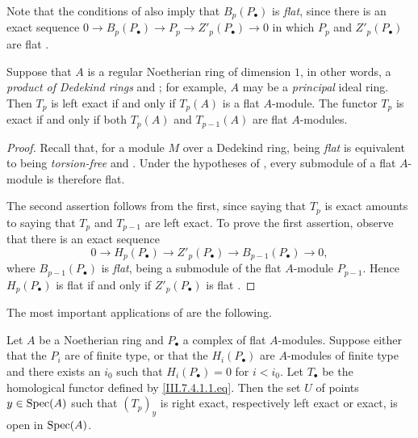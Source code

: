 Note that the conditions of  also imply that
$B_p(P_\bullet)$ is \emph{flat}, since there is an exact sequence
$0\longrightarrow B_p(P_\bullet)\longrightarrow P_p
\longrightarrow Z'_p(P_\bullet)\longrightarrow0$
in which $P_p$ and $Z'_p(P_\bullet)$ are flat
.

\begin{corollary}[7.4.3]
\label{III.7.4.3}
Suppose that $A$ is a regular Noetherian ring of dimension
$1$, in other words, a \emph{product of Dedekind rings}
 and ; for example, $A$
may be a \emph{principal} ideal ring.  Then $T_p$ is left exact if
and only if $T_p(A)$ is a flat $A$-module.  The functor $T_p$
is exact if and only if both $T_p(A)$ and $T_{p-1}(A)$ are
flat $A$-modules.
\end{corollary}

\begin{proof}
Recall that, for a module $M$ over a Dedekind ring, being \emph{flat}
is equivalent to being \emph{torsion-free}  and
.  Under the hypotheses of
, every submodule of a flat $A$-module is
therefore flat.

The second assertion follows from the first, since saying that
$T_p$ is exact amounts to saying that $T_p$ and $T_{p-1}$ are
left exact.  To prove the first assertion, observe that there
is an exact sequence
\[
  0
  \longrightarrow H_p(P_\bullet)
  \longrightarrow Z'_p(P_\bullet)
  \longrightarrow B_{p-1}(P_\bullet)
  \longrightarrow 0,
\]
where $B_{p-1}(P_\bullet)$ is \emph{flat}, being a submodule of the
flat $A$-module $P_{p-1}$.  Hence $H_p(P_\bullet)$ is flat if
and only if $Z'_p(P_\bullet)$ is flat
.
\end{proof}

The most important applications of  are the
following.

\begin{proposition}[7.4.4]
\label{III.7.4.4}
Let $A$ be a Noetherian ring and $P_\bullet$ a complex of flat
$A$-modules.  Suppose either that the $P_i$ are of finite
type, or that the $H_i(P_\bullet)$ are $A$-modules of finite
type and there exists an $i_0$ such that
$H_i(P_\bullet)=0$ for $i<i_0$.  Let $T_\bullet$ be the
homological functor defined by \eqref{III.7.4.1.1.eq}.  Then
the set $U$ of points $y\in\operatorname{Spec}(A)$ such that $(T_p)_y$
 is right exact, respectively left exact or
exact, is open in $\operatorname{Spec}(A)$.
\end{proposition}


